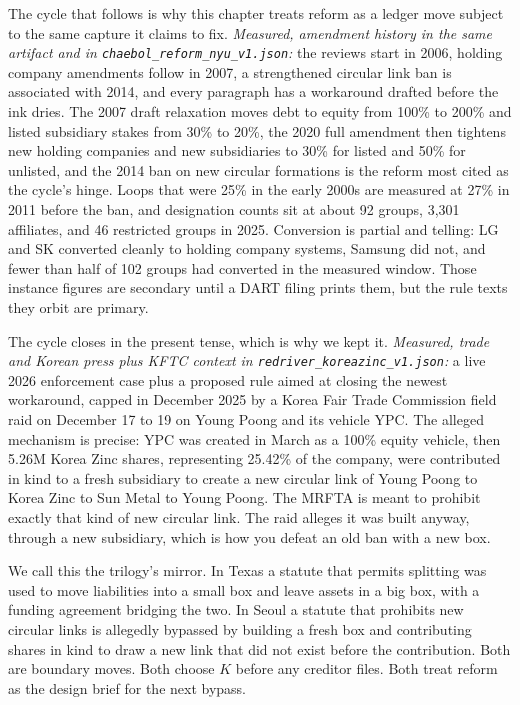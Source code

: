 The cycle that follows is why this chapter treats reform as a ledger move subject to the same capture it claims to fix. \textit{Measured, amendment history in the same artifact and in \texttt{chaebol\_reform\_nyu\_v1.json}:} the reviews start in 2006, holding company amendments follow in 2007, a strengthened circular link ban is associated with 2014, and every paragraph has a workaround drafted before the ink dries. The 2007 draft relaxation moves debt to equity from 100\% to 200\% and listed subsidiary stakes from 30\% to 20\%, the 2020 full amendment then tightens new holding companies and new subsidiaries to 30\% for listed and 50\% for unlisted, and the 2014 ban on new circular formations is the reform most cited as the cycle's hinge. Loops that were 25\% in the early 2000s are measured at 27\% in 2011 before the ban, and designation counts sit at about 92 groups, 3,301 affiliates, and 46 restricted groups in 2025. Conversion is partial and telling: LG and SK converted cleanly to holding company systems, Samsung did not, and fewer than half of 102 groups had converted in the measured window. Those instance figures are secondary until a DART filing prints them, but the rule texts they orbit are primary.

The cycle closes in the present tense, which is why we kept it. \textit{Measured, trade and Korean press plus KFTC context in \texttt{redriver\_koreazinc\_v1.json}:} a live 2026 enforcement case plus a proposed rule aimed at closing the newest workaround, capped in December 2025 by a Korea Fair Trade Commission field raid on December 17 to 19 on Young Poong and its vehicle YPC. The alleged mechanism is precise: YPC was created in March as a 100\% equity vehicle, then 5.26M Korea Zinc shares, representing 25.42\% of the company, were contributed in kind to a fresh subsidiary to create a new circular link of Young Poong to Korea Zinc to Sun Metal to Young Poong. The MRFTA is meant to prohibit exactly that kind of new circular link. The raid alleges it was built anyway, through a new subsidiary, which is how you defeat an old ban with a new box.

We call this the trilogy's mirror. In Texas a statute that permits splitting was used to move liabilities into a small box and leave assets in a big box, with a funding agreement bridging the two. In Seoul a statute that prohibits new circular links is allegedly bypassed by building a fresh box and contributing shares in kind to draw a new link that did not exist before the contribution. Both are boundary moves. Both choose $K$ before any creditor files. Both treat reform as the design brief for the next bypass.

